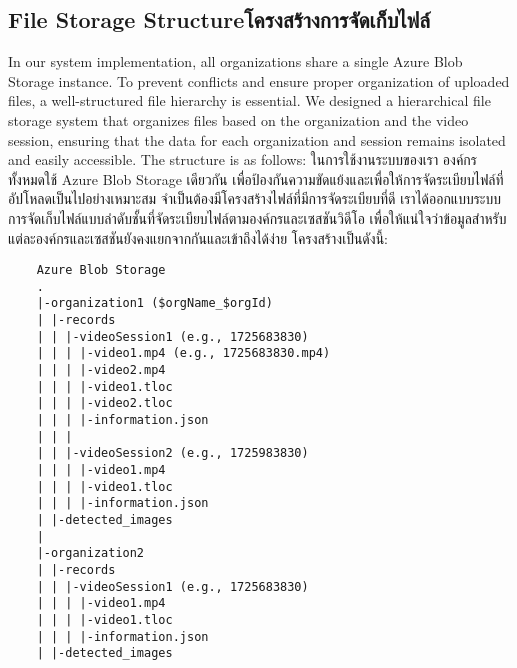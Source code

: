 \subsection{\ifenglish File Storage Structure\else โครงสร้างการจัดเก็บไฟล์\fi}

\ifenglish
In our system implementation, all organizations share a single Azure Blob Storage instance. To prevent conflicts and ensure proper organization of uploaded files, a well-structured file hierarchy is essential. We designed a hierarchical file storage system that organizes files based on the organization and the video session, ensuring that the data for each organization and session remains isolated and easily accessible. The structure is as follows:
\else
ในการใช้งานระบบของเรา องค์กรทั้งหมดใช้ Azure Blob Storage เดียวกัน เพื่อป้องกันความขัดแย้งและเพื่อให้การจัดระเบียบไฟล์ที่อัปโหลดเป็นไปอย่างเหมาะสม จำเป็นต้องมีโครงสร้างไฟล์ที่มีการจัดระเบียบที่ดี เราได้ออกแบบระบบการจัดเก็บไฟล์แบบลำดับชั้นที่จัดระเบียบไฟล์ตามองค์กรและเซสชันวิดีโอ เพื่อให้แน่ใจว่าข้อมูลสำหรับแต่ละองค์กรและเซสชันยังคงแยกจากกันและเข้าถึงได้ง่าย โครงสร้างเป็นดังนี้:
\fi

\begin{lstlisting}
    Azure Blob Storage
    .
    |-organization1 ($orgName_$orgId)
    | |-records
    | | |-videoSession1 (e.g., 1725683830)
    | | | |-video1.mp4 (e.g., 1725683830.mp4)
    | | | |-video2.mp4
    | | | |-video1.tloc
    | | | |-video2.tloc
    | | | |-information.json
    | | |
    | | |-videoSession2 (e.g., 1725983830)
    | | | |-video1.mp4
    | | | |-video1.tloc
    | | | |-information.json
    | |-detected_images
    |
    |-organization2
    | |-records
    | | |-videoSession1 (e.g., 1725683830)
    | | | |-video1.mp4
    | | | |-video1.tloc
    | | | |-information.json
    | |-detected_images
\end{lstlisting}

